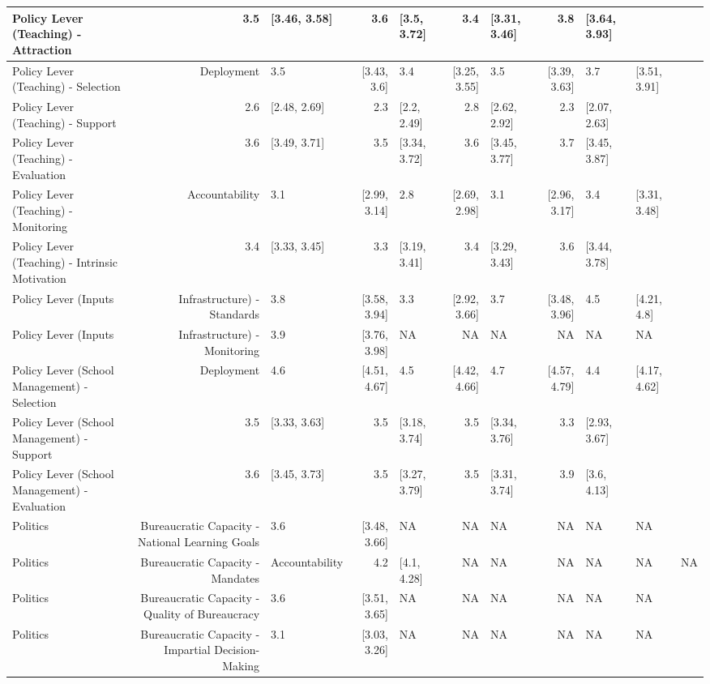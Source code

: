 \documentclass[
]{article}
\begin{document}
\begin{table}
\begin{tabular}[t]{l|r|l|r|l|r|l|r|l}
\hline
Policy Lever (Teaching) - Attraction & 3.5 & [3.46, 3.58] & 3.6 & [3.5, 3.72] & 3.4 & [3.31, 3.46] & 3.8 & [3.64, 3.93]\\
\hline
Policy Lever (Teaching) - Selection & Deployment & 3.5 & [3.43, 3.6] & 3.4 & [3.25, 3.55] & 3.5 & [3.39, 3.63] & 3.7 & [3.51, 3.91]\\
\hline
Policy Lever (Teaching) - Support & 2.6 & [2.48, 2.69] & 2.3 & [2.2, 2.49] & 2.8 & [2.62, 2.92] & 2.3 & [2.07, 2.63]\\
\hline
Policy Lever (Teaching) - Evaluation & 3.6 & [3.49, 3.71] & 3.5 & [3.34, 3.72] & 3.6 & [3.45, 3.77] & 3.7 & [3.45, 3.87]\\
\hline
Policy Lever (Teaching) - Monitoring & Accountability & 3.1 & [2.99, 3.14] & 2.8 & [2.69, 2.98] & 3.1 & [2.96, 3.17] & 3.4 & [3.31, 3.48]\\
\hline
Policy Lever (Teaching) - Intrinsic Motivation & 3.4 & [3.33, 3.45] & 3.3 & [3.19, 3.41] & 3.4 & [3.29, 3.43] & 3.6 & [3.44, 3.78]\\
\hline
Policy Lever (Inputs & Infrastructure) - Standards & 3.8 & [3.58, 3.94] & 3.3 & [2.92, 3.66] & 3.7 & [3.48, 3.96] & 4.5 & [4.21, 4.8]\\
\hline
Policy Lever (Inputs & Infrastructure) - Monitoring & 3.9 & [3.76, 3.98] & NA & NA & NA & NA & NA & NA\\
\hline
Policy Lever (School Management) - Selection & Deployment & 4.6 & [4.51, 4.67] & 4.5 & [4.42, 4.66] & 4.7 & [4.57, 4.79] & 4.4 & [4.17, 4.62]\\
\hline
Policy Lever (School Management) - Support & 3.5 & [3.33, 3.63] & 3.5 & [3.18, 3.74] & 3.5 & [3.34, 3.76] & 3.3 & [2.93, 3.67]\\
\hline
Policy Lever (School Management) - Evaluation & 3.6 & [3.45, 3.73] & 3.5 & [3.27, 3.79] & 3.5 & [3.31, 3.74] & 3.9 & [3.6, 4.13]\\
\hline
Politics & Bureaucratic Capacity - National Learning Goals & 3.6 & [3.48, 3.66] & NA & NA & NA & NA & NA & NA\\
\hline
Politics & Bureaucratic Capacity - Mandates & Accountability & 4.2 & [4.1, 4.28] & NA & NA & NA & NA & NA & NA\\
\hline
Politics & Bureaucratic Capacity - Quality of Bureaucracy & 3.6 & [3.51, 3.65] & NA & NA & NA & NA & NA & NA\\
\hline
Politics & Bureaucratic Capacity - Impartial Decision-Making & 3.1 & [3.03, 3.26] & NA & NA & NA & NA & NA & NA\\
\hline
\end{tabular}
\end{table}
\end{document}
